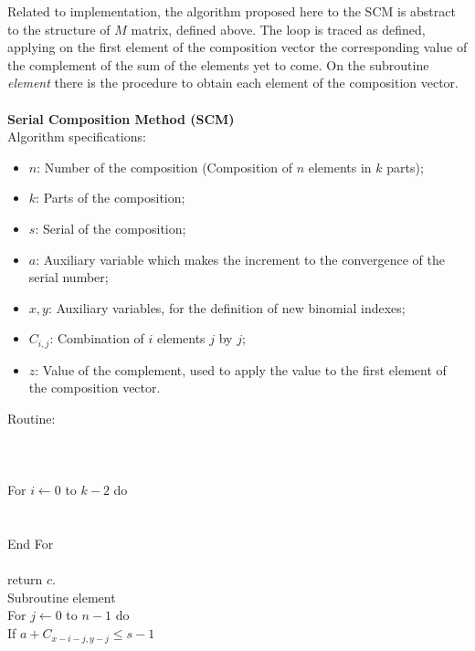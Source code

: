 \documentclass{amsart}
\begin{document}
Related to implementation, the algorithm proposed here to the SCM is abstract to the structure of {$M$} matrix, defined above. The loop is traced as defined, applying on the first element of the composition vector the corresponding value of the complement of the sum of the elements yet to come. On the subroutine \emph{element} there is the procedure to obtain each element of the composition vector.
\\\\
\textbf{Serial Composition Method (SCM)}
\\
Algorithm specifications:
        \begin{itemize}
        \item {$n$}: Number of the composition (Composition of {$n$} elements in {$k$} parts);
        \item {$k$}: Parts of the composition;
        \item {$s$}: Serial of the composition;
        \item {$a$}: Auxiliary variable which makes the increment to the convergence of the serial number;
        \item {$x,y$}: Auxiliary variables, for the definition of new binomial indexes;
        \item {$C_{i,j}$}: Combination of {$i$} elements {$j$} by {$j$};
        \item {$z$}: Value of the complement, used to apply the value to the first element of the composition vector.
        \end{itemize}
        Routine:
        \\
         \\
        \\
        \\
        \indent For {$i \leftarrow 0$} to {$k-2$} do\\
        \indent {}\\
        \indent {}\\
        \indent End For\\
        \\
        return {$c$}.\\
    Subroutine element \\
    \indent For {$j \leftarrow 0$} to {$n-1$} do\\
    \indent \indent If {$a + C_{x-i-j,y-j} \leq s-1$}\\
\end{document}
